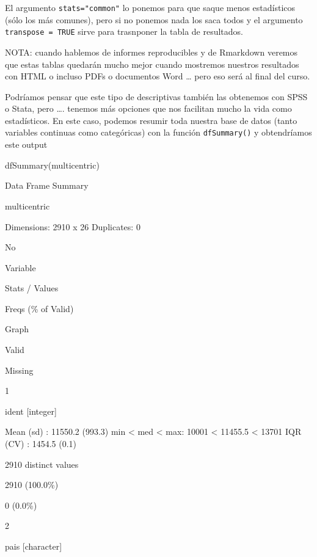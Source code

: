 \documentclass[
]{book}
\newenvironment{Shaded}{\begin{snugshade}}{\end{snugshade}}
\newcommand{\FunctionTok}[1]{\textcolor[rgb]{0.00,0.00,0.00}{#1}}
\newcommand{\NormalTok}[1]{#1}
\begin{document}
El argumento \texttt{stats="common"} lo ponemos para que saque menos estadísticos (sólo los más comunes), pero si no ponemos nada los saca todos y el argumento \texttt{transpose\ =\ TRUE} sirve para trasnponer la tabla de resultados.

NOTA: cuando hablemos de informes reproducibles y de Rmarkdown veremos que estas tablas quedarán mucho mejor cuando mostremos nuestros resultados con HTML o incluso PDFs o documentos Word \ldots{} pero eso será al final del curso.

Podríamos pensar que este tipo de descriptivas también las obtenemos con SPSS o Stata, pero \ldots. tenemos más opciones que nos facilitan mucho la vida como estadísticos. En este caso, podemos resumir toda nuestra base de datos (tanto variables continuas como categóricas) con la función \texttt{dfSummary()} y obtendríamos este output

\begin{Shaded}
\begin{Highlighting}[]
\FunctionTok{dfSummary}\NormalTok{(multicentric)}
\end{Highlighting}
\end{Shaded}

Data Frame Summary

multicentric

Dimensions: 2910 x 26
Duplicates: 0

No

Variable

Stats / Values

Freqs (\% of Valid)

Graph

Valid

Missing

1

ident
{[}integer{]}

Mean (sd) : 11550.2 (993.3)
min \textless{} med \textless{} max:
10001 \textless{} 11455.5 \textless{} 13701
IQR (CV) : 1454.5 (0.1)

2910 distinct values

2910
(100.0\%)

0
(0.0\%)

2

pais
{[}character{]}
\end{document}
